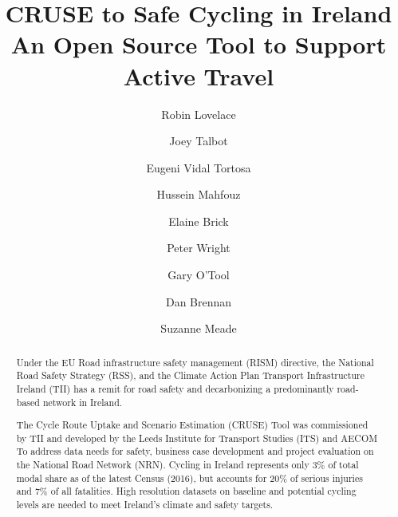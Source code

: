 \documentclass[
  super,
  preprint,
  3p]{elsarticle}
\begin{document}
\begin{frontmatter}
\title{CRUSE to Safe Cycling in Ireland \\\large{An Open Source Tool to
Support Active Travel} }
\author[1]{Robin Lovelace%
%
}
\author[1]{Joey Talbot%
%
}

\author[1]{Eugeni Vidal Tortosa%
%
}

\author[1]{Hussein Mahfouz%
%
}

\author[2]{Elaine Brick%
%
}

\author[3]{Peter Wright%
%
}

\author[2]{Gary O'Tool%
%
}

\author[4]{Dan Brennan%
%
}

\author[4]{Suzanne Meade%
%
}












        
\begin{abstract}
Under the EU Road infrastructure safety management (RISM) directive, the
National Road Safety Strategy (RSS), and the Climate Action Plan
Transport Infrastructure Ireland (TII) has a remit for road safety and
decarbonizing a predominantly road-based network in Ireland.

The Cycle Route Uptake and Scenario Estimation (CRUSE) Tool was
commissioned by TII and developed by the Leeds Institute for Transport
Studies (ITS) and AECOM To address data needs for safety, business case
development and project evaluation on the National Road Network (NRN).
Cycling in Ireland represents only 3\% of total modal share as of the
latest Census (2016), but accounts for 20\% of serious injuries and 7\%
of all fatalities. High resolution datasets on baseline and potential
cycling levels are needed to meet Ireland's climate and safety targets.


\end{abstract}
\end{frontmatter}
\end{document}
